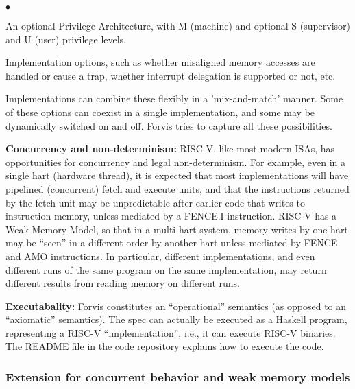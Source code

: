 \documentclass[11pt]{article}
\newenvironment{tightlist}%
{\begin{list}{$\bullet$}{%
    \setlength{\topsep}{0in}
    \setlength{\partopsep}{0in}
    \setlength{\itemsep}{0in}
    \setlength{\parsep}{0in}
    \setlength{\leftmargin}{1.5em}
    \setlength{\rightmargin}{0in}
    \setlength{\itemindent}{0in}
}
}%
{\end{list}
}
\begin{document}
\begin{itemize}
\begin{tightlist}
   \item An optional Privilege Architecture, with M (machine) and
    optional S (supervisor) and U (user) privilege levels.

   \item Implementation options, such as whether misaligned memory
   accesses are handled or cause a trap, whether interrupt delegation
   is supported or not, etc.

  \end{tightlist}

  Implementations can combine these flexibly in a 'mix-and-match'
  manner.  Some of these options can coexist in a single
  implementation, and some may be dynamically switched on and off.
  Forvis tries to capture all these possibilities.

\item {\bf Concurrency and non-determinism:} RISC-V, like most modern
ISAs, has opportunities for concurrency and legal non-determinism.
For example, even in a single hart (hardware thread), it is expected
that most implementations will have pipelined (concurrent) fetch and
execute units, and that the instructions returned by the fetch unit
may be unpredictable after earlier code that writes to instruction
memory, unless mediated by a FENCE.I instruction.  RISC-V has a Weak
Memory Model, so that in a multi-hart system, memory-writes by one
hart may be ``seen'' in a different order by another hart unless
mediated by FENCE and AMO instructions.  In particular, different
implementations, and even different runs of the same program on the
same implementation, may return different results from reading memory
on different runs.

\item {\bf Executabality:} Forvis constitutes an ``operational''
semantics (as opposed to an ``axiomatic'' semantics).  The spec can
actually be executed as a Haskell program, representing a RISC-V
``implementation'', i.e., it can execute RISC-V binaries.  The README
file in the code repository explains how to execute the code.

\end{itemize}


\subsubsection{Extension for concurrent behavior and weak memory models}
\end{document}
